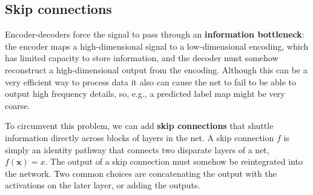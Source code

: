 
	
	



\subsection{Skip connections}
Encoder-decoders force the signal to pass through an {\bf information bottleneck}: the encoder maps a high-dimensional signal to a low-dimensional encoding, which has limited capacity to store information, and the decoder must somehow reconstruct a high-dimensional output from the encoding. Although this can be a very efficient way to process data it also can cause the net to fail to be able to output high frequency details, so, e.g., a predicted label map might be very coarse.

To circumvent this problem, we can add {\bf skip connections} that shuttle information directly across blocks of layers in the net. A skip connection $f$ is simply an identity pathway that connects two disparate layers of a net, $f(\mathbf{x}) = x$. The output of a skip connection must somehow be reintegrated into the network. Two common choices are concatenating the output with the activations on the later layer, or adding the outputs.

